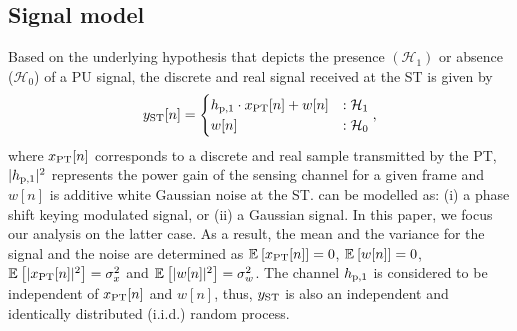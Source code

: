 \subsection{Signal model}
Based on the underlying hypothesis that depicts the presence $(\mathcal{H}_1)$ or absence ($\mathcal{H}_0$) of a PU signal, the discrete and real signal received at the ST is given by  
\begin{equation}
\yrcvd[n] = 
\begin{cases}
\hpo \cdot \xp[n] + w[n] & : \mathcal{H}_1 \\
w[n] & :\mathcal{H}_0
\end{cases},
\label{eq:sys_mod_p1s}
\end{equation}
where $x_{\text{PT}}[n]$ corresponds to a discrete and real sample transmitted by the PT, $|h_{\text{p,1}}|^2$ represents the power gain of the sensing channel for a given frame and $w[n]$ is additive white Gaussian noise at the ST.  can be modelled as: (i) a phase shift keying modulated signal, or (ii) a Gaussian signal. 
In this paper, we focus our analysis on the latter case. As a result, the mean and the variance for the signal and the noise are determined as ${\mathbb E}_{}\left[ x_{\text{PT}}[n] \right] = 0$, ${\mathbb E}_{}\left[ w[n] \right] = 0$, ${\mathbb E}_{}\left[ |x_{\text{PT}}[n]|^2 \right] = \sigma^2_{x}$ and ${\mathbb E}_{}\left[ |w[n]|^2 \right] = \sigma^2_{w}$. The channel $h_{\text{p,1}}$ is considered to be independent of $x_{\text{PT}}[n]$ and $w[n]$, thus, $y_{\text{ST}}$ is also an independent and identically distributed (i.i.d.) random process. %

